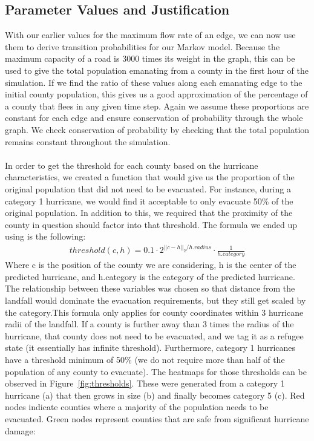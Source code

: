 \documentclass[titlepage]{article}
\begin{document}
  \subsection{Parameter Values and Justification}
    With our earlier values for the maximum flow rate of an edge, we can now use them to derive transition probabilities for our Markov model. Because the maximum capacity of a road is 3000 times its weight in the graph, this can be used to give the total population emanating from a county in the first hour of the simulation. If we find the ratio of these values along each emanating edge to the initial county population, this gives us a good approximation of the percentage of a county that flees in any given time step. Again we assume these proportions are constant for each edge and ensure conservation of probability through the whole graph. We check conservation of probability by checking that the total population remains constant throughout the simulation.\\
    \\
    In order to get the threshold for each county based on the hurricane characteristics, we created a function that would give us the proportion of the original population that did not need to be evacuated. For instance, during a category 1 hurricane, we would find it acceptable to only evacuate 50\% of the original population. In addition to this, we required that the proximity of the county in question should factor into that threshold. The formula we ended up using is the following:
    \begin{align*}
        threshold(c, h) = 0.1 \cdot 2^{||c-h||_2 / h.radius} \cdot \frac{1}{h.category}
    \end{align*}
    Where c is the position of the county we are considering, h is the center of the predicted hurricane, and h.category is the category of the predicted hurricane. The relationship between these variables was chosen so that distance from the landfall would dominate the evacuation requirements, but they still get scaled by the category.This formula only applies for county coordinates within 3 hurricane radii of the landfall. If a county is further away than 3 times the radius of the hurricane, that county does not need to be evacuated, and we tag it as a refugee state (it essentially has infinite threshold). Furthermore, category 1 hurricanes have a threshold minimum of 50\% (we do not require more than half of the population of any county to evacuate). The heatmaps for those thresholds can be observed in Figure~\ref{fig:thresholds}. These were generated from a category 1 hurricane (a) that then grows in size (b) and finally becomes category 5 (c). Red nodes indicate counties where a majority of the population needs to be evacuated. Green nodes represent counties that are safe from significant hurricane damage:
\end{document}
